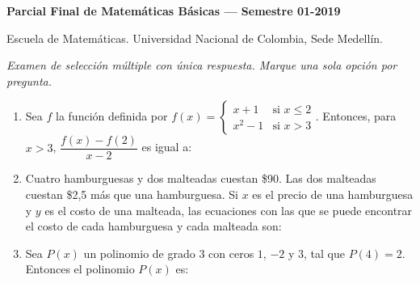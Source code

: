 \documentclass[11pt]{article}
\begin{document}
{\large\bfseries Parcial Final de Matemáticas Básicas --- Semestre 01-2019}

\medskip
\noindent Escuela de Matemáticas. Universidad Nacional de Colombia, Sede Medellín.

\medskip
\noindent\textit{Examen de selección múltiple con única respuesta. Marque una sola opción por pregunta.}

\begin{enumerate}
\item Sea $f$ la función definida por $f(x) = \begin{cases} x + 1 & \text{si } x \leq 2 \\ x^2 - 1 & \text{si } x > 3 \end{cases}$. Entonces, para $x > 3$, $\dfrac{f(x) - f(2)}{x - 2}$ es igual a:

\item Cuatro hamburguesas y dos malteadas cuestan \$90. Las dos malteadas cuestan \$2,5 más que una hamburguesa. Si $x$ es el precio de una hamburguesa y $y$ es el costo de una malteada, las ecuaciones con las que se puede encontrar el costo de cada hamburguesa y cada malteada son:

\item Sea $P(x)$ un polinomio de grado 3 con ceros $1$, $-2$ y $3$, tal que $P(4) = 2$. Entonces el polinomio $P(x)$ es:


\end{enumerate}
\end{document}
